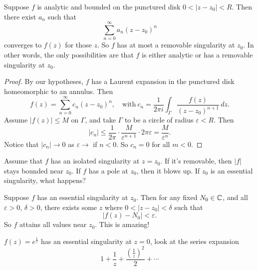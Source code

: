 \begin{theorem}
    Suppose $f$ is analytic and bounded on the punctured disk $0<|z-z_0|<R$. Then there exist $a_n $ such that \[
        \sum_{n=0}^{\infty} a_n (z-z_0)^n       
    \] converges to $f(z)$ for those $z$. So $f$ has at most a removable singularity at $z_0$. In other words, the only possibilities are that $f$ is either analytic or has a removable singularity at $z_0$.
\end{theorem}
\begin{proof}
    By our hypotheses, $f$ has a Laurent expansion in the punctured disk homeomorphic to an annulus. Then \[
        f(z)=\sum_{n=0}^{\infty} c_n (z-z_0)^n ,\quad\text{with} \ c_n = \frac{1}{2\pi i}\int_{\Gamma }^{} \frac{f(z)}{(z-z_0)^{n+1}} \, dz.
    \] Assume $|f(z)|\leq M$ on $\Gamma $, and take $\Gamma $ to be a circle of radius $\varepsilon <R$. Then \[
    |c_n |\leq \frac{1}{2\pi}\cdot \frac{M}{\varepsilon ^{n+1}}\cdot 2\pi \varepsilon =\frac{M}{\varepsilon ^n }.
\] Notice that $|c_n|\to 0$ as $\varepsilon \to $ if $n<0$. So $c_n =0$ for all $m<0$.
\end{proof}
    Assume that $f$ has an isolated singularity at $z=z_0$. If it's removable, then $|f|$ stays bounded near $z_0$. If $f$ has a pole at $z_0$, then it blows up. If $z_0$ is an essential singularity, what happens?
    \begin{theorem}
        Suppose $f$ has an essential singularity at $z_0$. Then for any fixed $N_0\in \mathbb{C}$, and all $\varepsilon >0$, $\delta >0$, there exists some $z$ where $0<|z-z_0|<\delta$ such that \[
            |f(z)-N_0|<\varepsilon .
        \] So $f$ attains all values near $z_0$. This is amazing!
    \end{theorem}
\begin{example}
    $f(z)=e^{\frac{1}{z}}$ has an essential singularity at $z=0$, look at the series expansion \[
        1+\frac{1}{z}+\frac{\left( \frac{1}{z} \right) ^2}{2}+\cdots 
    \] 
\end{example}

